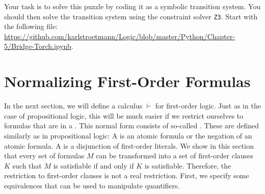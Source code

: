 \noindent
Your task is to solve this puzzle by coding it as a symbolic transition system.  You should then solve the
transition system using the constraint solver \texttt{Z3}.
Start with the following file:
\\[0.2cm]
\hspace*{0.0cm}
\href{https://github.com/karlstroetmann/Logic/blob/master/Python/Chapter-5/Bridge-Torch.ipynb}{https://github.com/karlstroetmann/Logic/blob/master/Python/Chapter-5/Bridge-Torch.ipynb}.
\eox

\section{Normalizing First-Order Formulas}
In the next section, we will define a calculus $\vdash$ for first-order logic. Just as in the case of
propositional logic, this will be much easier if we restrict ourselves to formulas that are in a . 
This normal form consists of so-called .
These are defined similarly as in propositional logic: A 
is an atomic formula or the negation of an atomic formula. A  
is a disjunction of first-order literals. We show in this section that every set of formulas $M$ can be
transformed into a set of first-order clauses $K$ such that 
$M$ is satisfiable if and only if $K$ is satisfiable. Therefore, the restriction to first-order clauses is
not a real restriction. First, we specify some equivalences that can be used to manipulate quantifiers.

